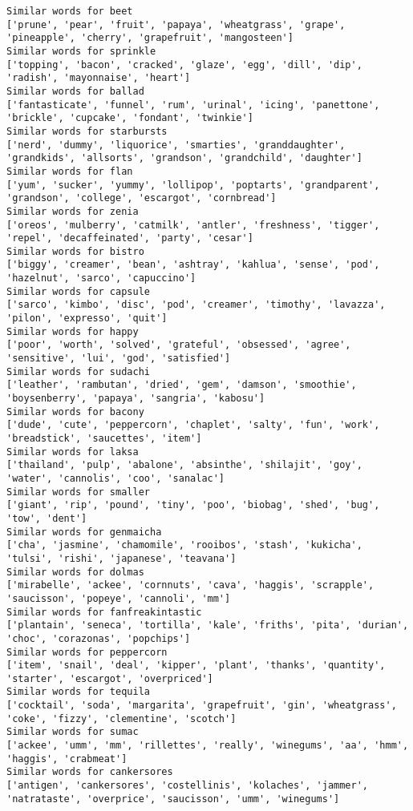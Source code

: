 \documentclass[11pt]{article}
\begin{document}
\begin{Verbatim}[commandchars=\\\{\}]
Similar words for beet
['prune', 'pear', 'fruit', 'papaya', 'wheatgrass', 'grape', 'pineapple', 'cherry', 'grapefruit', 'mangosteen']
Similar words for sprinkle
['topping', 'bacon', 'cracked', 'glaze', 'egg', 'dill', 'dip', 'radish', 'mayonnaise', 'heart']
Similar words for ballad
['fantasticate', 'funnel', 'rum', 'urinal', 'icing', 'panettone', 'brickle', 'cupcake', 'fondant', 'twinkie']
Similar words for starbursts
['nerd', 'dummy', 'liquorice', 'smarties', 'granddaughter', 'grandkids', 'allsorts', 'grandson', 'grandchild', 'daughter']
Similar words for flan
['yum', 'sucker', 'yummy', 'lollipop', 'poptarts', 'grandparent', 'grandson', 'college', 'escargot', 'cornbread']
Similar words for zenia
['oreos', 'mulberry', 'catmilk', 'antler', 'freshness', 'tigger', 'repel', 'decaffeinated', 'party', 'cesar']
Similar words for bistro
['biggy', 'creamer', 'bean', 'ashtray', 'kahlua', 'sense', 'pod', 'hazelnut', 'sarco', 'capuccino']
Similar words for capsule
['sarco', 'kimbo', 'disc', 'pod', 'creamer', 'timothy', 'lavazza', 'pilon', 'expresso', 'quit']
Similar words for happy
['poor', 'worth', 'solved', 'grateful', 'obsessed', 'agree', 'sensitive', 'lui', 'god', 'satisfied']
Similar words for sudachi
['leather', 'rambutan', 'dried', 'gem', 'damson', 'smoothie', 'boysenberry', 'papaya', 'sangria', 'kabosu']
Similar words for bacony
['dude', 'cute', 'peppercorn', 'chaplet', 'salty', 'fun', 'work', 'breadstick', 'saucettes', 'item']
Similar words for laksa
['thailand', 'pulp', 'abalone', 'absinthe', 'shilajit', 'goy', 'water', 'cannolis', 'coo', 'sanalac']
Similar words for smaller
['giant', 'rip', 'pound', 'tiny', 'poo', 'biobag', 'shed', 'bug', 'tow', 'dent']
Similar words for genmaicha
['cha', 'jasmine', 'chamomile', 'rooibos', 'stash', 'kukicha', 'tulsi', 'rishi', 'japanese', 'teavana']
Similar words for dolmas
['mirabelle', 'ackee', 'cornnuts', 'cava', 'haggis', 'scrapple', 'saucisson', 'popeye', 'cannoli', 'mm']
Similar words for fanfreakintastic
['plantain', 'seneca', 'tortilla', 'kale', 'friths', 'pita', 'durian', 'choc', 'corazonas', 'popchips']
Similar words for peppercorn
['item', 'snail', 'deal', 'kipper', 'plant', 'thanks', 'quantity', 'starter', 'escargot', 'overpriced']
Similar words for tequila
['cocktail', 'soda', 'margarita', 'grapefruit', 'gin', 'wheatgrass', 'coke', 'fizzy', 'clementine', 'scotch']
Similar words for sumac
['ackee', 'umm', 'mm', 'rillettes', 'really', 'winegums', 'aa', 'hmm', 'haggis', 'crabmeat']
Similar words for cankersores
['antigen', 'cankersores', 'costellinis', 'kolaches', 'jammer', 'natrataste', 'overprice', 'saucisson', 'umm', 'winegums']

\end{Verbatim}
\end{document}

